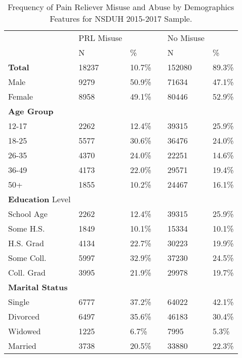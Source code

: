 \documentclass[sigconf]{acmart}
\begin{document}
\begin{table}
  \caption{Frequency of Pain Reliever Misuse and Abuse
  by Demographics Features for NSDUH 2015-2017 Sample.}
  \label{tab:freq}
  \begin{tabular}{llllll}
    \toprule
              & PRL Misuse & & & No Misuse & \\
              & N & \% &  & N & \% \\
    \midrule
    \textbf{Total}     & 18237 & 10.7\% & & 152080 & 89.3\% \\
    Male      & 9279 & 50.9\% & & 71634 & 47.1\%  \\
    Female    & 8958 & 49.1\% & & 80446 & 52.9\%  \\
    \midrule
    \textbf{Age Group} &  &  &  &  & \\
    12-17     & 2262 & 12.4\% & & 39315 & 25.9\% \\
    18-25     & 5577 & 30.6\% & & 36476 & 24.0\% \\
    26-35     & 4370 & 24.0\% & & 22251 & 14.6\% \\
    36-49     & 4173 & 22.0\% & & 29571 & 19.4\% \\
    50+       & 1855 & 10.2\% & & 24467 & 16.1\% \\
    \midrule
    \textbf{Education} Level &  &  &  &  & \\
    School Age & 2262 & 12.4\% & & 39315 & 25.9\% \\
    Some H.S.  & 1849 & 10.1\% & & 15334 & 10.1\% \\
    H.S. Grad  & 4134 & 22.7\% & & 30223 & 19.9\% \\
    Some Coll. & 5997 & 32.9\% & & 37230 & 24.5\% \\
    Coll. Grad & 3995 & 21.9\% & & 29978 & 19.7\% \\
    \midrule
    \textbf{Marital Status} &  &  &  &  & \\
    Single    & 6777 & 37.2\% & & 64022 & 42.1\% \\
    Divorced  & 6497 & 35.6\% & & 46183 & 30.4\% \\
    Widowed   & 1225 &  6.7\% & &  7995 &  5.3\% \\
    Married   & 3738 & 20.5\% & & 33880 & 22.3\% \\
    \bottomrule
  \end{tabular}
\end{table}

\end{document}
